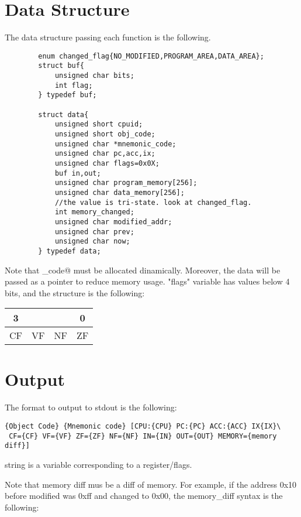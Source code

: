 \documentclass[a4paper]{article}
\begin{document}
    \section{Data Structure}
        The data structure passing each function is the following.
        \begin{verbatim}
        enum changed_flag{NO_MODIFIED,PROGRAM_AREA,DATA_AREA};
        struct buf{
            unsigned char bits;
            int flag;
        } typedef buf;
        
        struct data{
            unsigned short cpuid;
            unsigned short obj_code;
            unsigned char *mnemonic_code;
            unsigned char pc,acc,ix;
            unsigned char flags=0x0X;
            buf in,out;
            unsigned char program_memory[256];
            unsigned char data_memory[256];
            //the value is tri-state. look at changed_flag.
            int memory_changed;
            unsigned char modified_addr;
            unsigned char prev;
            unsigned char now;
        } typedef data;
        \end{verbatim}

        Note that \verb@mnemonic_code@ must be allocated dinamically. Moreover, the data will be passed as a pointer to reduce memory usage. "flags" variable has values below 4 bits, and the structure is the following:
        
        \begin{table}[htb]
            \begin{tabular}{|c|c|c|c|}
            \hline 3&&&0\\
            \hline CF&VF&NF&ZF\\
            \hline
            \end{tabular}
        \end{table}

    \section{Output}
        The format to output to stdout is the following:
        \begin{verbatim}
{Object Code} {Mnemonic code} [CPU:{CPU} PC:{PC} ACC:{ACC} IX{IX}\
 CF={CF} VF={VF} ZF={ZF} NF={NF} IN={IN} OUT={OUT} MEMORY={memory diff}]
        \end{verbatim}

        {string} is a variable corresponding to a register/flags.

        Note that memory diff mus be a diff of memory. For example, if the address 0x10 before modified was 0xff and changed to 0x00, the {memory\_diff} syntax is the following:
\end{document}
